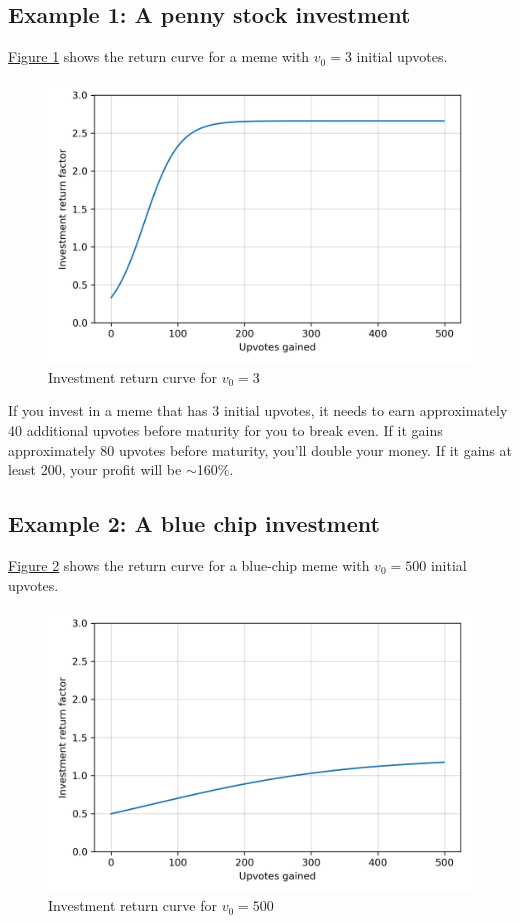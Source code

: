 \documentclass[a4paper, 12pt]{article}
\begin{document}
\subsection*{Example 1: A penny stock investment}
\label{sec:org65c4e8f}

\hyperref[fig:orgb83d7e9]{Figure 1} shows the return curve for a meme with \(v_0 = 3\) initial upvotes.

\begin{figure}[H]
\centering
\includegraphics[width=.9\linewidth]{./paper_figure_1.png}
\caption{\label{fig:orgb83d7e9}
Investment return curve for \(v_0 = 3\)}
\end{figure}

If you invest in a meme that has 3 initial upvotes, it needs to earn approximately 40
additional upvotes before maturity for you to break even. If it gains
approximately 80 upvotes before maturity, you'll double your money. If it gains
at least 200, your profit will be \(\sim\)160\%.

\subsection*{Example 2: A blue chip investment}
\label{sec:org36a6dfb}

\hyperref[fig:org4b4fc9a]{Figure 2} shows the return curve for a blue-chip meme with \(v_0 = 500\)
initial upvotes.

\begin{figure}[H]
\centering
\includegraphics[width=.9\linewidth]{./paper_figure_2.png}
\caption{\label{fig:org4b4fc9a}
Investment return curve for \(v_0 = 500\)}
\end{figure}
\end{document}
